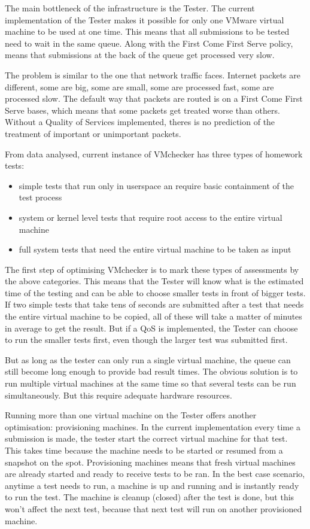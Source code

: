 
The main bottleneck of the infrastructure is the Tester. The current
implementation of the Tester makes it possible for only one  VMware virtual
machine to be used at one time. This means that all submissions to be
tested need to wait in the same queue. Along with the First Come First
Serve policy, means that submissions at the back of the queue get processed
very slow.

The problem is similar to the one that network traffic faces. Internet
packets are different, some are big, some are small, some are processed
fast, some are processed slow. The default way that packets are routed is
on a First Come First Serve bases, which means that some packets get
treated worse than others. Without a Quality of Services implemented,
theres is no prediction of the treatment of important or unimportant
packets.

From data analysed, current instance of VMchecker has three types of
homework tests:
\begin{itemize}
\item simple tests that run only in userspace an require basic containment
of the test process
\item system or kernel level tests that require root access to the entire
virtual machine
\item full system tests that need the entire virtual machine to be taken as
input
\end{itemize}

The first step of optimising VMchecker is to mark these types of
assessments by the above categories. This means that the Tester will know
what is the estimated time of the testing and can be able to choose smaller
tests in front of bigger tests. If two simple tests that take tens of
seconds are submitted after a test that needs the entire virtual machine to
be copied, all of these will take a matter of minutes in average to get the
result. But if a QoS is implemented, the Tester can choose to run the
smaller tests first, even though the larger test was submitted first.

But as long as the tester can only run a single virtual machine, the queue
can still become long enough to provide bad result times. The obvious
solution is to run multiple virtual machines at the same time so that
several tests can be run simultaneously. But this require adequate hardware
resources.

Running more than one virtual machine on the Tester offers another
optimisation: provisioning machines. In the current implementation every
time a submission is made, the tester start the correct virtual machine for
that test. This takes time because the machine needs to be started or
resumed from a snapshot on the spot. Provisioning machines means that fresh
virtual machines are already started and ready to receive tests to be ran.
In the best case scenario, anytime a test needs to run, a machine is up and
running and is instantly ready to run the test. The machine is cleanup
(closed) after the test is done, but this won't affect the next test,
because that next test will run on another provisioned machine.

